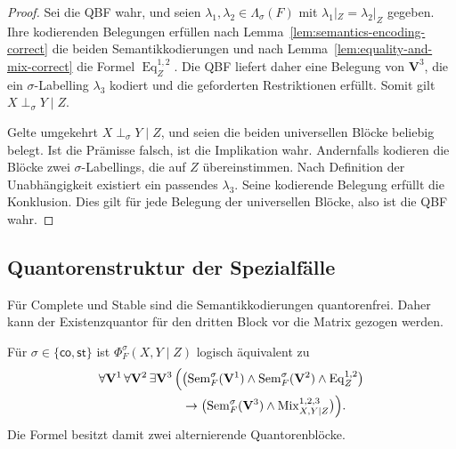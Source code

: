 \begin{proof}
    Sei die QBF wahr, und seien
    \(\lambda_1,\lambda_2\in\Lambda_\sigma(F)\) mit
    \(\lambda_1|_Z=\lambda_2|_Z\) gegeben. Ihre kodierenden Belegungen
    erfüllen nach Lemma~\ref{lem:semantics-encoding-correct} die beiden
    Semantikkodierungen und nach
    Lemma~\ref{lem:equality-and-mix-correct} die Formel
    \(\operatorname{Eq}^{1,2}_Z\). Die QBF liefert daher eine Belegung von
    \(\mathbf V^3\), die ein \(\sigma\)-Labelling \(\lambda_3\) kodiert
    und die geforderten Restriktionen erfüllt. Somit gilt
    \(X\perp_\sigma Y\mid Z\).

    Gelte umgekehrt \(X\perp_\sigma Y\mid Z\), und seien die beiden
    universellen Blöcke beliebig belegt. Ist die Prämisse falsch, ist die
    Implikation wahr. Andernfalls kodieren die Blöcke zwei
    \(\sigma\)-Labellings, die auf \(Z\) übereinstimmen. Nach Definition
    der Unabhängigkeit existiert ein passendes \(\lambda_3\). Seine
    kodierende Belegung erfüllt die Konklusion. Dies gilt für jede Belegung
    der universellen Blöcke, also ist die QBF wahr.
\end{proof}

\iffalse
\subsection{Quantorenstruktur der Spezialfälle}
\label{subsec:independence-prenex}

Für Complete und Stable sind die Semantikkodierungen quantorenfrei. Daher
kann der Existenzquantor für den dritten Block vor die Matrix gezogen
werden.

\begin{Proposition}
    \label{prop:co-st-independence-prenex}
    Für \(\sigma\in\{\mathsf{co},\mathsf{st}\}\) ist
    \(\Phi^\sigma_F(X,Y\mid Z)\) logisch äquivalent zu
    \[
    \begin{split}
        \forall\mathbf V^1\,\forall\mathbf V^2\,
        \exists\mathbf V^3\,
        \Bigl(&
        \bigl(
            \operatorname{Sem}^{\sigma}_F(\mathbf V^1)
            \land
            \operatorname{Sem}^{\sigma}_F(\mathbf V^2)
            \land
            \operatorname{Eq}^{1,2}_Z
        \bigr)
        \\
        &\rightarrow
        \bigl(
            \operatorname{Sem}^{\sigma}_F(\mathbf V^3)
            \land
            \operatorname{Mix}^{1,2,3}_{X,Y\mid Z}
        \bigr)
        \Bigr).
    \end{split}
    \]
    Die Formel besitzt damit zwei alternierende Quantorenblöcke.
\end{Proposition}

